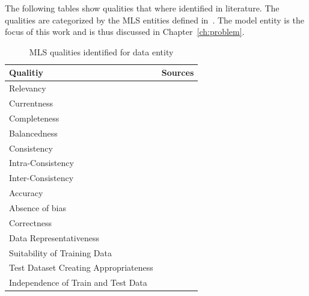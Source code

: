 The following tables show qualities that where identified in literature.
The qualities are categorized by the \ac{MLS} entities defined in~\cite{siebert_construction_2021}.
The model entity is the focus of this work and is thus discussed in Chapter~\ref{ch:problem}.
\begin{table}[h]\label{tb:LiteratureQualitiesData}
    \centering\footnotesize
    \begin{tabular}{p{} p{}}
        \textbf{Qualitiy} & \textbf{Sources} \\
        \toprule
        Relevancy &~\cite{ashmore_assuring_2021} \\
        Currentness &~\cite{siebert_construction_2021} \\
        Completeness &~\cite{ashmore_assuring_2021, vogelsang_requirements_2019,
                            siebert_construction_2021} \\
        Balancedness &~\cite{ashmore_assuring_2021,siebert_construction_2021} \\
        Consistency &~\cite{vogelsang_requirements_2019} \\
        Intra-Consistency &~\cite{siebert_construction_2021} \\
        Inter-Consistency &~\cite{siebert_construction_2021} \\
        Accuracy &~\cite{ashmore_assuring_2021} \\
        Absence of bias &~\cite{siebert_construction_2021} \\
        Correctness &~\cite{vogelsang_requirements_2019} \\
        Data Representativeness&~\cite{nakamichi_requirements-driven_2020,
                                    siebert_construction_2021}\\
        Suitability of Training Data &~\cite{nakamichi_requirements-driven_2020} \\
        Test Dataset Creating Appropriateness &~\cite{nakamichi_requirements-driven_2020} \\
        Independence of Train and Test Data &~\cite{nakamichi_requirements-driven_2020,
                                                    siebert_construction_2021} \\
    \end{tabular}
    \caption{MLS qualities identified for data entity}
\end{table}

